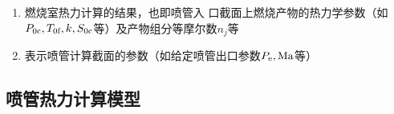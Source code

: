\sssection[已知条件]
\vspace*{-1em}

\begin{enumerate}[\hspace*{1.5em} (1) ]
	\item  燃烧室热力计算的结果，也即喷管入
口截面上燃烧产物的热力学参数（如$P_{0\text{c}},T_{0\text{f}},k,S_{0\text{c}}$等）及产物组分等摩尔数$n_j$等\vspace*{-0.5em}
	\item 表示喷管计算截面的参数（如给定喷管出口参数$P_{\rm{e}} , \text{Ma}$等）
\end{enumerate}

\subsection{喷管热力计算模型}
\sssection[热力计算模型]
